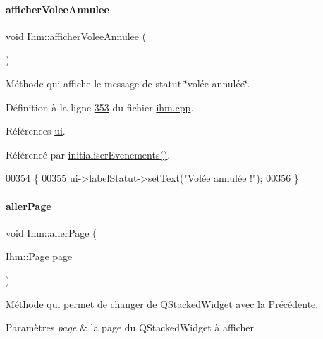 \paragraph{\texorpdfstring{afficher\+Volee\+Annulee}{afficherVoleeAnnulee}}
{\footnotesize\ttfamily void Ihm\+::afficher\+Volee\+Annulee (\begin{DoxyParamCaption}{ }\end{DoxyParamCaption})\hspace{0.3cm}{\ttfamily [slot]}}



Méthode qui affiche le message de statut \char`\"{}volée annulée\char`\"{}. 



Définition à la ligne \hyperlink{ihm_8cpp_source_l00353}{353} du fichier \hyperlink{ihm_8cpp_source}{ihm.\+cpp}.



Références \hyperlink{ihm_8h_source_l00052}{ui}.



Référencé par \hyperlink{ihm_8cpp_source_l00075}{initialiser\+Evenements()}.


\begin{DoxyCode}
00354 \{
00355     \hyperlink{class_ihm_a0ac5f47856566ceeeca1720109bf70ea}{ui}->labelStatut->setText(\textcolor{stringliteral}{"Volée annulée !"});
00356 \}
\end{DoxyCode}
\mbox{\label{class_ihm_a52bf0bd258d00a16d3e1037a9288948b}} 
\paragraph{\texorpdfstring{aller\+Page}{allerPage}}
{\footnotesize\ttfamily void Ihm\+::aller\+Page (\begin{DoxyParamCaption}\item[{\hyperlink{class_ihm_a472c7a7bec7e6e0230842f78ace4833e}{Ihm\+::\+Page}}]{page }\end{DoxyParamCaption})\hspace{0.3cm}{\ttfamily [slot]}}



Méthode qui permet de changer de Q\+Stacked\+Widget avec la Précédente. 


\begin{DoxyParams}{Paramètres}
{\em page} & la page du Q\+Stacked\+Widget à afficher \\
\hline
\end{DoxyParams}


